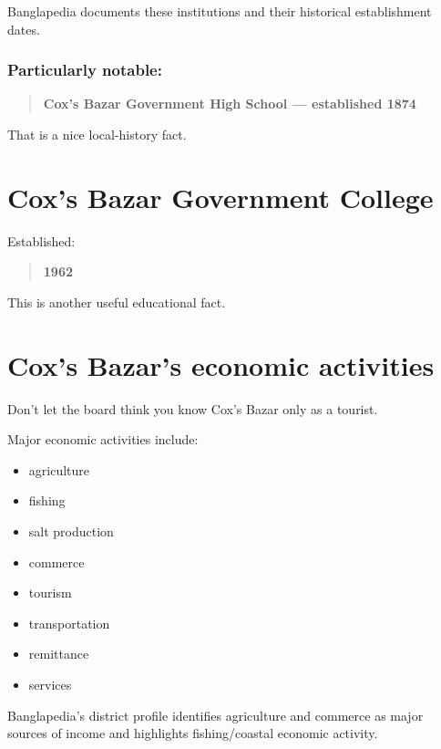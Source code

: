 Banglapedia documents these institutions and their historical establishment dates.

\subsubsection{Particularly notable:}

\begin{quote}
\textbf{Cox's Bazar Government High School --- established 1874}\\
\end{quote}

That is a nice local-history fact.

\medskip

\section{Cox's Bazar Government College}

Established:

\begin{quote}
\textbf{1962}\\
\end{quote}

This is another useful educational fact.

\medskip

\section{Cox's Bazar's economic activities}

Don't let the board think you know Cox's Bazar only as a tourist.

Major economic activities include:

\begin{itemize}
  \item agriculture
  \item fishing
  \item salt production
  \item commerce
  \item tourism
  \item transportation
  \item remittance
  \item services
\end{itemize}

Banglapedia's district profile identifies agriculture and commerce as major sources of income and highlights fishing/coastal economic activity.

